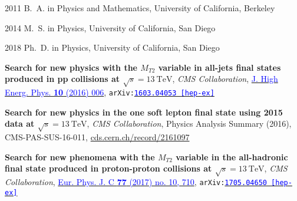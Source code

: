 \begin{frontmatter}
\begin{vitapage}                                                               
\begin{vita}                                                                   
  \item[2011] B.~A. in Physics and Mathematics, University of California, Berkeley                                                    
  \item[2014] M.~S. in Physics, University of California, San Diego                                                    
  \item[2018] Ph.~D. in Physics, University of California, San Diego    
\end{vita}                                                                     
\begin{publications}                                                           
\item \textbf{Search for new physics with the $M_{T2}$ variable in all-jets final states produced in pp collisions at $\sqrt{s}=13~\mathrm{TeV}$}, {\it CMS Collaboration},  \href{http://dx.doi.org/10.1007/JHEP10(2016)006}{\textcolor{blue}{J. High Energ. Phys. \textbf{10} (2016) 006}}, {\tt arXiv:\href{http://arxiv.org/abs/1603.04053}{\textcolor{blue}{1603.04053 [hep-ex]}}}
\item \textbf{Search for new physics in the one soft lepton final state using 2015 data at $\sqrt{s}=13~\mathrm{TeV}$}, {\it CMS Collaboration}, Physics Analysis Summary (2016), CMS-PAS-SUS-16-011, \textcolor{blue}{\href{https://cds.cern.ch/record/2161097}{cds.cern.ch/record/2161097}}
\item \textbf{Search for new phenomena with the $M_{T2}$ variable in the all-hadronic final state produced in proton-proton collisions at $\sqrt{s}=13~\mathrm{TeV}$}, {\it CMS Collaboration}, \href{http://dx.doi.org/10.1140/epjc/s10052-017-5267-x}{\textcolor{blue}{Eur. Phys. J. C {\bf77} (2017) no. 10, 710}}, {\tt arXiv:\href{http://arxiv.org/abs/1705.04650}{\textcolor{blue}{1705.04650 [hep-ex]}}}

\end{publications}                                                             
\end{vitapage}                                                                 
                                                                               


\end{frontmatter}
